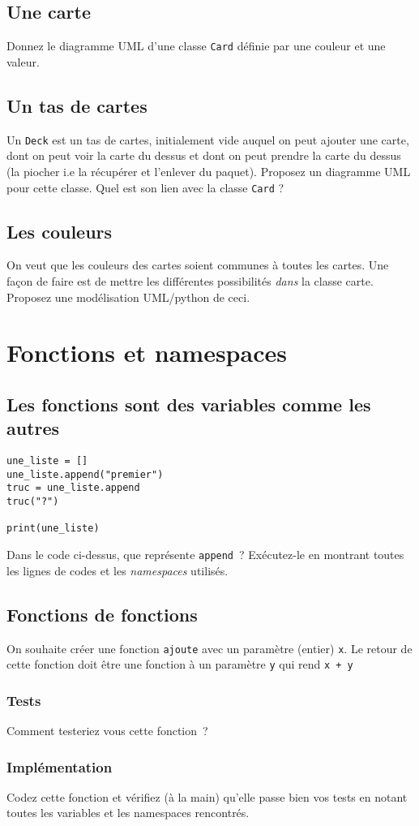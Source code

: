\documentclass[12pt]{article}
\begin{document}
\subsection{Une carte}
Donnez le diagramme UML d'une classe \verb|Card| définie par une couleur et une valeur. 

\subsection{Un tas de cartes}
Un \verb|Deck| est un tas de cartes, initialement vide auquel on peut ajouter une carte, dont on peut voir la carte du
dessus et dont on peut prendre la carte du dessus (la piocher i.e la récupérer et l'enlever du paquet). Proposez un
diagramme UML pour cette classe. Quel est son lien avec la classe \verb|Card| ?

\subsection{Les couleurs}
On veut que les couleurs des cartes soient communes à toutes les cartes. Une façon de faire est de mettre les différentes possibilités {\em dans}  la classe carte. Proposez une modélisation UML/python de ceci. 

\section{Fonctions et namespaces}

\subsection{Les fonctions sont des variables comme les autres}


\lstset{language=Python}
\begin{lstlisting}
une_liste = []
une_liste.append("premier")
truc = une_liste.append
truc("?")

print(une_liste)
\end{lstlisting}


Dans le code ci-dessus, que représente \verb|append|~? Exécutez-le en montrant toutes les lignes de codes et les {\em namespaces} utilisés.


\subsection{Fonctions de fonctions}

On souhaite créer une fonction \verb|ajoute| avec un paramètre (entier) \verb|x|. Le retour de cette fonction doit être une fonction à un paramètre \verb|y| qui rend \verb|x + y|

\subsubsection{Tests}

Comment testeriez vous cette fonction~?

\subsubsection{Implémentation}

Codez cette fonction et vérifiez (à la main) qu'elle passe bien vos tests en notant toutes les variables et les namespaces rencontrés.
\end{document}
